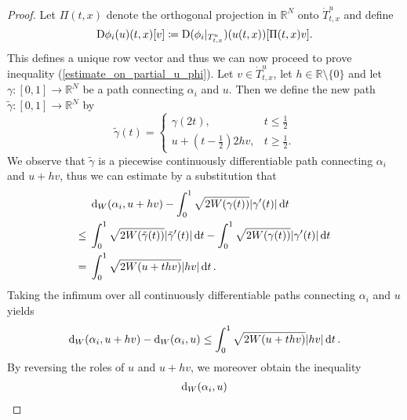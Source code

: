 \begin{proof}
	Let $ \Pi ( t , x ) $ denote the orthogonal projection in $ \mathbb{ R }^{ 
	N } $ onto $ \dot{ T }_{ t , x }^{ u } $ and define 
	\begin{equation*}
		\mathrm{D} \phi_{ i } ( u ) ( t, x ) [ v ]
		\coloneqq
		\mathrm{D} ( \phi_{ i } |_{ T_{ t , x }^{ u } } ) ( u ( t , x ) ) [ \Pi ( t , x ) v ].
	\end{equation*}
	This defines a unique row vector and thus we can now proceed to prove inequality (\ref{estimate_on_partial_u_phi}).
	Let $ v \in \dot{ T }_{ t, x }^{ u } $, let $ h \in \mathbb{ R } \setminus 
	\{ 0 \} $ and let $ \gamma \colon [ 0 , 1 ] \to \mathbb{ R }^{ N } $ be a 
	path connecting $ \alpha_{ i } $ and $ u $. Then we define the new path $ 
	\tilde{ \gamma } \colon [ 0 , 1 ] \to \mathbb{ R }^{ N } $ by 
	\begin{equation*}
		\tilde{ \gamma } ( t ) =
		\begin{cases}
			\gamma ( 2 t ),
			&  t \leq \frac{ 1 }{ 2 }
			\\
			u + 
			\left( t - \frac{ 1 }{ 2 } \right)
			2 h v,
			& t \geq \frac{ 1 }{ 2 }.
		\end{cases}
	\end{equation*}
	We observe that $ \tilde{ \gamma } $ is a piecewise continuously differentiable path connecting $ \alpha_{i } $ and $ u + h v $, thus we can estimate by a substitution that
	\begin{align*}
		& \geodesic_distance ( \alpha_{ i } , u + hv )
		-
		\int_{ 0 }^{ 1 }
			\sqrt{
				2 W ( \gamma ( t ) ) }
			\abs{ \gamma ' ( t ) }
		\dd{ t }
		\\
		\leq {} &
		\int_{ 0 }^{ 1 }
			\sqrt{ 2 W ( \tilde{ \gamma } ( t ) ) } 
			\abs{ \tilde{ \gamma } ' ( t ) }
		\dd{ t }
		-
		\int_{ 0 }^{ 1 }
			\sqrt{ 2 W ( \gamma ( t ) ) } 
			\abs{ \gamma ' ( t ) }
		\dd{ t }
		\\
		={} &
		\int_{ 0 }^{ 1 }
			\sqrt{ 2 W ( u + t h v ) }
			\abs{ h v }
		\dd{ t }.
	\end{align*}
	Taking the infimum over all continuously differentiable paths connecting $ 
	\alpha_{ i } $ and $ u $ yields 
	\begin{equation*}
		\geodesic_distance ( \alpha_{ i } , u + h v )
		- 
		\geodesic_distance ( \alpha_{ i } , u )
		\leq
		\int_{ 0 }^{ 1 }
			\sqrt{ 2 W ( u + t h v ) }
			\abs{ h v }
		\dd{ t }.
	\end{equation*}
	By reversing the roles of $ u $ and $ u + h v $, we moreover obtain the 
	inequality
	\begin{align*}
		\geodesic_distance ( \alpha_{ i } , u ) 

\end{align*}
\end{proof}
